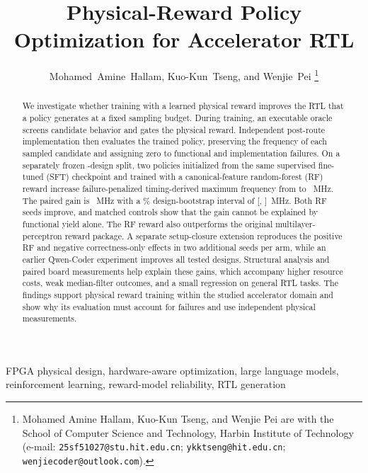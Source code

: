 \documentclass[journal]{IEEEtran}
\begin{document}
\title{Physical-Reward Policy Optimization for Accelerator RTL}

\author{Mohamed~Amine~Hallam, Kuo-Kun~Tseng, and Wenjie~Pei%
\thanks{Mohamed Amine Hallam, Kuo-Kun Tseng, and Wenjie Pei are with the
School of Computer Science and Technology, Harbin Institute of Technology
(e-mail: \texttt{25sf51027@stu.hit.edu.cn}; \texttt{ykktseng@hit.edu.cn};
\texttt{wenjiecoder@outlook.com}).}%
}

\maketitle

\begin{abstract}
We investigate whether training with a learned physical reward improves the
RTL that a policy generates at a fixed sampling budget. During training, an
executable oracle screens candidate behavior and gates the physical reward.
Independent post-route implementation then evaluates the trained
policy, preserving the frequency of each sampled candidate and assigning zero
to functional and implementation failures. On a separately frozen
-design split, two policies initialized from the
same supervised fine-tuned (SFT) checkpoint and trained with a canonical-feature
random-forest (RF) reward increase failure-penalized timing-derived maximum frequency from
 to
~MHz. The paired gain is
~MHz with a
\% design-bootstrap interval of
[,
]~MHz. Both RF seeds improve, and matched
controls show that the gain cannot be explained by functional yield alone.
The RF reward also outperforms the original multilayer-perceptron reward
package. A separate setup-closure extension reproduces the positive RF and
negative correctness-only effects in two additional seeds per arm, while an
earlier Qwen-Coder experiment improves all  tested
designs. Structural analysis and paired board measurements help explain these
gains, which accompany higher resource costs, weak median-filter outcomes,
and a small regression on general RTL tasks. The findings support physical
reward training within the studied accelerator domain and show why its
evaluation must account for failures and use independent physical measurements.
\end{abstract}

\begin{IEEEkeywords}
FPGA physical design, hardware-aware optimization, large language models,
reinforcement learning, reward-model reliability, RTL generation
\end{IEEEkeywords}











\end{document}

